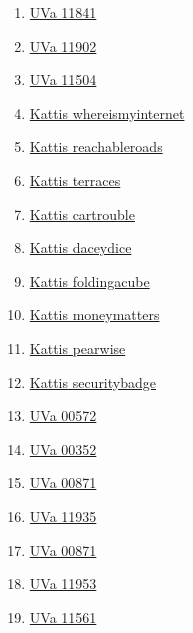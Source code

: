 \begin{enumerate}
\item \href{https://onlinejudge.org/index.php?option=com_onlinejudge&Itemid=8&page=show_problem&problem=2941}{UVa 11841}
\item \href{https://onlinejudge.org/index.php?option=com_onlinejudge&Itemid=8&page=show_problem&problem=3053}{UVa 11902}
\item \href{https://onlinejudge.org/index.php?option=com_onlinejudge&Itemid=8&page=show_problem&problem=2499}{UVa 11504}
\item \href{https://open.kattis.com/problems/whereismyinternet}{Kattis whereismyinternet}
\item \href{https://open.kattis.com/problems/reachableroads}{Kattis reachableroads}
\item \href{https://open.kattis.com/problems/terraces}{Kattis terraces}
\item \href{https://open.kattis.com/problems/cartrouble}{Kattis cartrouble}
\item \href{https://open.kattis.com/problems/daceydice}{Kattis daceydice}
\item \href{https://open.kattis.com/problems/foldingacube}{Kattis foldingacube}
\item \href{https://open.kattis.com/problems/moneymatters}{Kattis moneymatters}
\item \href{https://open.kattis.com/problems/pearwise}{Kattis pearwise}
\item \href{https://open.kattis.com/problems/securitybadge}{Kattis securitybadge}
\item \href{https://onlinejudge.org/index.php?option=com_onlinejudge&Itemid=8&page=show_problem&problem=513}{UVa 00572}
\item \href{https://onlinejudge.org/index.php?option=com_onlinejudge&Itemid=8&page=show_problem&problem=288}{UVa 00352}
\item \href{https://onlinejudge.org/index.php?option=com_onlinejudge&Itemid=8&page=show_problem&problem=812}{UVa 00871}
\item \href{https://onlinejudge.org/index.php?option=com_onlinejudge&Itemid=8&page=show_problem&problem=3086}{UVa 11935}
\item \href{https://onlinejudge.org/index.php?option=com_onlinejudge&Itemid=8&page=show_problem&problem=812}{UVa 00871}
\item \href{https://onlinejudge.org/index.php?option=com_onlinejudge&Itemid=8&page=show_problem&problem=3104}{UVa 11953}
\item \href{https://onlinejudge.org/index.php?option=com_onlinejudge&Itemid=8&page=show_problem&problem=2597}{UVa 11561}

\end{enumerate}
